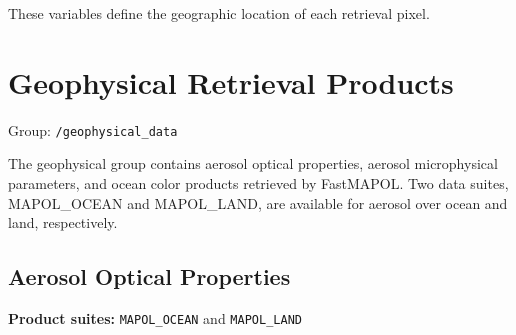 \documentclass[
  11pt,
  letterpaper,
]{scrreprt}
\begin{document}
These variables define the geographic location of each retrieval pixel.

\section{Geophysical Retrieval
Products}\label{geophysical-retrieval-products}

Group: \texttt{/geophysical\_data}

The geophysical group contains aerosol optical properties, aerosol
microphysical parameters, and ocean color products retrieved by
FastMAPOL. Two data suites, MAPOL\_OCEAN and MAPOL\_LAND, are available
for aerosol over ocean and land, respectively.

\subsection{Aerosol Optical
Properties}\label{aerosol-optical-properties}

\textbf{Product suites:} \texttt{MAPOL\_OCEAN} and \texttt{MAPOL\_LAND}
\end{document}
